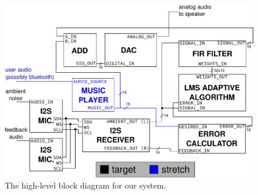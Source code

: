 \documentclass{fpgairpods}
\begin{document}
\begin{figure}
\includegraphics[width=\textwidth]{./figs/block_diagram.pdf}
\caption{The high-level block diagram for our system.}
\label{fig:blockdiagram}
\end{figure}
\end{document}
